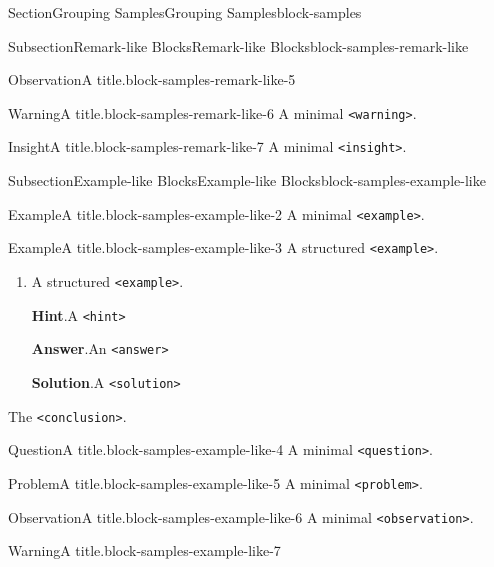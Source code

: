 \documentclass[twoside,10pt,]{article}
\newcommand{\blocktitlefont}{\relax}
\newcommand{\mono}[1]{\texttt{#1}}
\numberwithin{equation}{section}
\begin{document}
\begin{sectionptx}{Section}{Grouping Samples}{}{Grouping Samples}{}{}{block-samples}
\begin{subsectionptx}{Subsection}{Remark-like Blocks}{}{Remark-like Blocks}{}{}{block-samples-remark-like}
\begin{observation}{Observation}{A title.}{block-samples-remark-like-5}
\end{observation}
\begin{warning}{Warning}{A title.}{block-samples-remark-like-6}%
A minimal \mono{<warning>}.%
\end{warning}
\begin{insight}{Insight}{A title.}{block-samples-remark-like-7}%
A minimal \mono{<insight>}.%
\end{insight}
\end{subsectionptx}
%
%
\typeout{************************************************}
\typeout{************************************************}
%
\begin{subsectionptx}{Subsection}{Example-like Blocks}{}{Example-like Blocks}{}{}{block-samples-example-like}
\begin{example}{Example}{A title.}{block-samples-example-like-2}%
A minimal \mono{<example>}.%
\end{example}
\begin{example}{Example}{A title.}{block-samples-example-like-3}%
A structured \mono{<example>}.%
\begin{enumerate}[font=\bfseries,label=(\alph*),ref=\alph*]%
\item{}A structured \mono{<example>}.%
\par\smallskip%
\noindent\textbf{\blocktitlefont Hint}.\hypertarget{block-samples-example-like-3-3-2}{}\quad{}A \mono{<hint>}%
\par\smallskip%
\noindent\textbf{\blocktitlefont Answer}.\hypertarget{block-samples-example-like-3-3-3}{}\quad{}An \mono{<answer>}%
\par\smallskip%
\noindent\textbf{\blocktitlefont Solution}.\hypertarget{block-samples-example-like-3-3-4}{}\quad{}A \mono{<solution>}%
\end{enumerate}%
The \mono{<conclusion>}.%
\end{example}
\begin{question}{Question}{A title.}{block-samples-example-like-4}%
A minimal \mono{<question>}.%
\end{question}
\begin{problem}{Problem}{A title.}{block-samples-example-like-5}%
A minimal \mono{<problem>}.%
\end{problem}
\begin{observation}{Observation}{A title.}{block-samples-example-like-6}%
A minimal \mono{<observation>}.%
\end{observation}
\begin{warning}{Warning}{A title.}{block-samples-example-like-7}%

\end{warning}
\end{subsectionptx}
\end{sectionptx}
\end{document}
